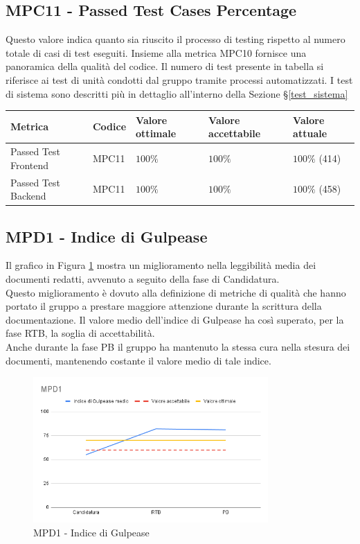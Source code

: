 \subsection{MPC11 - Passed Test Cases Percentage}
\label{s:mpc11}
Questo valore indica quanto sia riuscito il processo di testing rispetto al numero totale di casi di test eseguiti.
Insieme alla metrica MPC10 fornisce una panoramica della qualità del codice.
Il numero di test presente in tabella si riferisce ai test di unità condotti dal gruppo tramite processi automatizzati.
I test di sistema sono descritti più in dettaglio all'interno della Sezione \S \ref{test_sistema}
\begin{table}[H]
    \centering
    \begin{tabularx}{\textwidth}{X|l|l|l|l}
        \hline
        \textbf{Metrica}     & \textbf{Codice} & \textbf{Valore ottimale} & \textbf{Valore accettabile} & \textbf{Valore attuale} \\
        \hline
        Passed Test Frontend & MPC11           & $100\%$                  & $ 100\%$                    & $ 100\%$ (414)          \\
        \hline
        Passed Test Backend  & MPC11           & $100\%$                  & $ 100\%$                    & $ 100\%$ (458)          \\
        \hline
    \end{tabularx}
\end{table}


\subsection{MPD1 - Indice di Gulpease}
\label{s:mpd1}
Il grafico in Figura \ref{fig:mpd1} mostra un miglioramento nella leggibilità media dei documenti redatti, avvenuto a seguito della fase di Candidatura.\\
Questo miglioramento è dovuto alla definizione di metriche di qualità che hanno portato il gruppo a prestare maggiore attenzione durante la scrittura della documentazione.
Il valore medio dell'indice di Gulpease ha così superato, per la fase RTB, la soglia di accettabilità.\\

Anche durante la fase PB il gruppo ha mantenuto la stessa cura nella stesura dei documenti, mantenendo costante il valore medio di tale indice.
\begin{figure}[htbp]
    \centering
    \includegraphics[width=0.8\textwidth]{img/MPD1.png}
    \caption{MPD1 - Indice di Gulpease}
    \label{fig:mpd1}
\end{figure}


